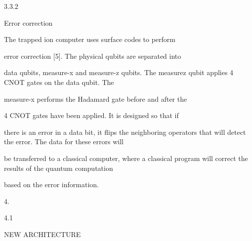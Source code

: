 \documentclass[a4paper,portrait,12pt]{article}
\begin{document}
3.3.2





\begin{flushleft}
Error correction
\end{flushleft}





\begin{flushleft}
The trapped ion computer uses surface codes to perform
\end{flushleft}


\begin{flushleft}
error correction [5]. The physical qubits are separated into
\end{flushleft}


\begin{flushleft}
data qubits, measure-x and measure-z qubits. The measurez qubit applies 4 CNOT gates on the data qubit. The
\end{flushleft}


\begin{flushleft}
measure-x performs the Hadamard gate before and after the
\end{flushleft}


\begin{flushleft}
4 CNOT gates have been applied. It is designed so that if
\end{flushleft}


\begin{flushleft}
there is an error in a data bit, it flips the neighboring operators that will detect the error. The data for these errors will
\end{flushleft}


\begin{flushleft}
be transferred to a classical computer, where a classical program will correct the results of the quantum computation
\end{flushleft}


\begin{flushleft}
based on the error information.
\end{flushleft}





4.


4.1





\begin{flushleft}
NEW ARCHITECTURE
\end{flushleft}
\end{document}
